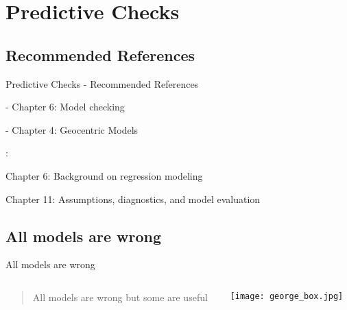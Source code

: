 \section{Predictive Checks}

\subsection{Recommended References}
\begin{frame}{Predictive Checks - Recommended References}
	\begin{vfilleditems}
		\item \textcite{gelman2013bayesian} - Chapter 6: Model checking
		\item \textcite{mcelreath2020statistical} - Chapter 4: Geocentric Models
		\item \textcite{gelman2020regression}:
		\begin{vfilleditems}
			\item Chapter 6: Background on regression modeling
			\item Chapter 11: Assumptions, diagnostics, and model evaluation
		\end{vfilleditems}
		\item \textcite{gelmanBayesianWorkflow2020}
	\end{vfilleditems}
\end{frame}

\subsection{All models are wrong}
\begin{frame}{All models are wrong}
	\begin{columns}
		\begin{column}{0.8\textwidth}
			\begin{quotation}
				All models are wrong but some are useful
			\end{quotation}
			\vfill
			\textcite{boxScienceStatistics1976}
		\end{column}
		\begin{column}{0.2\textwidth}
			\texttt{[image: george\_box.jpg]}
		\end{column}
	\end{columns}
\end{frame}

